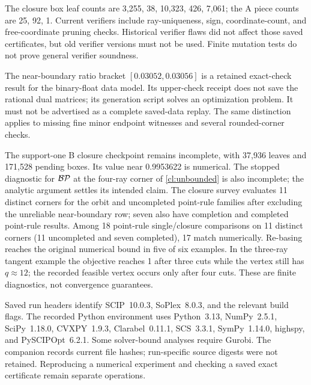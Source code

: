 The closure box leaf counts are 3,255, 38, 10,323, 426, 7,061; the A
piece counts are 25, 92, 1. Current verifiers include ray-uniqueness,
sign, coordinate-count, and free-coordinate pruning checks. Historical
verifier flaws did not affect those saved certificates, but old verifier
versions must not be used. Finite mutation tests do not prove general
verifier soundness.

The near-boundary ratio bracket $[0.03052, 0.03056]$ is a retained
exact-check result for the binary-float data model. Its upper-check
receipt does not save the rational dual matrices; its generation script
solves an optimization problem. It must not be advertised as a complete
saved-data replay. The same distinction applies to missing fine minor
endpoint witnesses and several rounded-corner checks.

The support-one B closure checkpoint remains incomplete, with 37,936
leaves and 171,528 pending boxes. Its value near 0.9953622 is numerical.
The stopped diagnostic for $\mathcal {BP}$ at the four-ray corner of
\cref{cl:unbounded} is also incomplete; the analytic argument settles
its intended claim. The closure
survey evaluates 11 distinct corners for the orbit and uncompleted
point-rule families after excluding the unreliable near-boundary row;
seven also have completion and completed point-rule results.
Among 18 point-rule single/closure comparisons on
11 distinct corners (11 uncompleted and seven completed), 17 match
numerically. Re-basing reaches the original numerical bound in five of
six examples. In the three-ray tangent example the objective reaches 1 after three
cuts while the vertex still has $q\approx 12$; the recorded feasible
vertex occurs only after four cuts. These are finite diagnostics,
not convergence guarantees.

Saved run headers identify SCIP~10.0.3, SoPlex~8.0.3, and the relevant
build flags. The recorded Python environment uses Python~3.13,
NumPy~2.5.1, SciPy~1.18.0, CVXPY~1.9.3, Clarabel~0.11.1,
SCS~3.3.1, SymPy~1.14.0, highspy, and PySCIPOpt~6.2.1.
Some solver-bound analyses require Gurobi. The companion records current
file hashes; run-specific source digests were not retained. Reproducing a numerical experiment and checking a saved
exact certificate remain separate operations.
